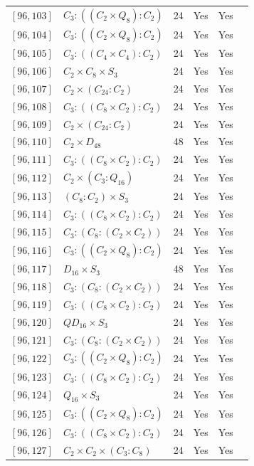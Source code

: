 \documentclass[12pt, a4paper]{article}
\theoremstyle{plain}
\theoremstyle{definition}
\begin{document}
\begin{longtable}{llcccl}
  $[96,103]$ & $C_3 : ((C_2 \times Q_8) : C_2)$ & 24 & Yes & Yes \\
  $[96,104]$ & $C_3 : ((C_2 \times Q_8) : C_2)$ & 24 & Yes & Yes \\
  $[96,105]$ & $C_3 : ((C_4 \times C_4) : C_2)$ & 24 & Yes & Yes \\
  $[96,106]$ & $C_2 \times C_8 \times S_3$ & 24 & Yes & Yes \\
  $[96,107]$ & $C_2 \times (C_{24} : C_2)$ & 24 & Yes & Yes \\
  $[96,108]$ & $C_3 : ((C_8 \times C_2) : C_2)$ & 24 & Yes & Yes \\
  $[96,109]$ & $C_2 \times (C_{24} : C_2)$ & 24 & Yes & Yes \\
  $[96,110]$ & $C_2 \times D_{48}$ & 48 & Yes & Yes \\
  $[96,111]$ & $C_3 : ((C_8 \times C_2) : C_2)$ & 24 & Yes & Yes \\
  $[96,112]$ & $C_2 \times (C_3 : Q_{16})$ & 24 & Yes & Yes \\
  $[96,113]$ & $(C_8 : C_2) \times S_3$ & 24 & Yes & Yes \\
  $[96,114]$ & $C_3 : ((C_8 \times C_2) : C_2)$ & 24 & Yes & Yes \\
  $[96,115]$ & $C_3 : (C_8 : (C_2 \times C_2))$ & 24 & Yes & Yes \\
  $[96,116]$ & $C_3 : ((C_2 \times Q_8) : C_2)$ & 24 & Yes & Yes \\
  $[96,117]$ & $D_{16} \times S_3$ & 48 & Yes & Yes \\
  $[96,118]$ & $C_3 : (C_8 : (C_2 \times C_2))$ & 24 & Yes & Yes \\
  $[96,119]$ & $C_3 : ((C_8 \times C_2) : C_2)$ & 24 & Yes & Yes \\
  $[96,120]$ & $QD_{16} \times S_3$ & 24 & Yes & Yes \\
  $[96,121]$ & $C_3 : (C_8 : (C_2 \times C_2))$ & 24 & Yes & Yes \\
  $[96,122]$ & $C_3 : ((C_2 \times Q_8) : C_2)$ & 24 & Yes & Yes \\
  $[96,123]$ & $C_3 : ((C_8 \times C_2) : C_2)$ & 24 & Yes & Yes \\
  $[96,124]$ & $Q_{16} \times S_3$ & 24 & Yes & Yes \\
  $[96,125]$ & $C_3 : ((C_2 \times Q_8) : C_2)$ & 24 & Yes & Yes \\
  $[96,126]$ & $C_3 : ((C_8 \times C_2) : C_2)$ & 24 & Yes & Yes \\
  $[96,127]$ & $C_2 \times C_2 \times (C_3 : C_8)$ & 24 & Yes & Yes \\

\end{longtable}
\end{document}
